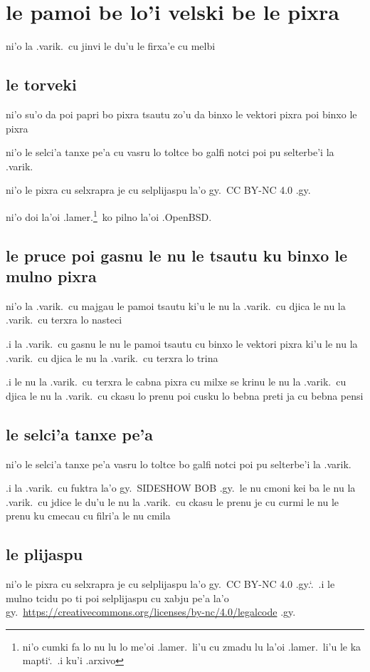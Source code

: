 \documentclass{report}
\newcommand\sds{\spacefactor\sfcode`.\ \space}
\begin{document}
\section{le pamoi be lo'i velski be le pixra}
ni'o la .varik.\ cu jinvi le du'u le firxa'e cu melbi

\subsection{le torveki}
ni'o su'o da poi papri bo pixra tsautu zo'u da binxo le vektori pixra poi binxo le pixra

ni'o le selci'a tanxe pe'a cu vasru lo toltce bo galfi notci poi pu selterbe'i la .varik.

ni'o le pixra cu selxrapra je cu selplijaspu la'o gy.\ CC BY-NC 4.0 .gy.

ni'o doi la'oi .lamer.\footnote{ni'o cumki fa lo nu lu lo me'oi .lamer.\ li'u cu zmadu lu la'oi .lamer.\ li'u le ka mapti\sds  .i ku'i .arxivo}\ ko pilno la'oi .OpenBSD.

\subsection{le pruce poi gasnu le nu le tsautu ku binxo le mulno pixra}
ni'o la .varik.\ cu majgau le pamoi tsautu ki'u le nu la .varik.\ cu djica le nu la .varik.\ cu terxra lo nasteci

.i la .varik.\ cu gasnu le nu le pamoi tsautu cu binxo le vektori pixra ki'u le nu la .varik.\ cu djica le nu la .varik.\ cu terxra lo trina

.i le nu la .varik.\ cu terxra le cabna pixra cu milxe se krinu le nu la .varik.\ cu djica le nu la .varik.\ cu ckasu lo prenu poi cusku lo bebna preti ja cu bebna pensi

\subsection{le selci'a tanxe pe'a}
ni'o le selci'a tanxe pe'a vasru lo toltce bo galfi notci poi pu selterbe'i la .varik.

.i la .varik.\ cu fuktra la'o gy.\ SIDESHOW BOB .gy.\ le nu cmoni kei ba le nu la .varik.\ cu jdice le du'u le nu la .varik.\ cu ckasu le prenu je cu curmi le nu le prenu ku cmecau cu filri'a le nu cmila

\subsection{le plijaspu}
ni'o le pixra cu selxrapra je cu selplijaspu la'o gy.\ CC BY-NC 4.0 .gy.\sds  .i le mulno tcidu po ti poi selplijaspu cu xabju pe'a la'o gy.\ \url{https://creativecommons.org/licenses/by-nc/4.0/legalcode} .gy.
\end{document}
